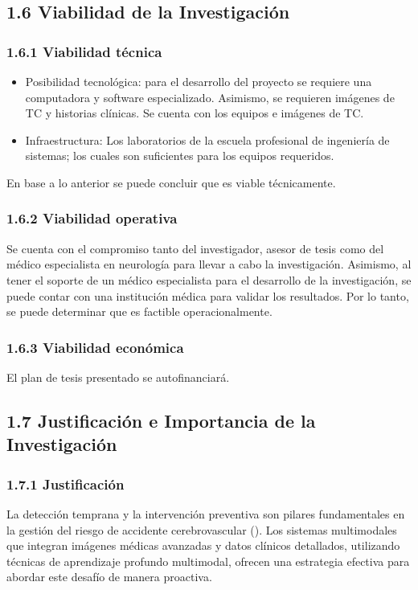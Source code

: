 \subsection{1.6 Viabilidad de la Investigación}
\subsubsection{1.6.1 Viabilidad técnica}

\begin{itemize}
    \item Posibilidad tecnológica: para el desarrollo del proyecto se requiere una computadora y software especializado. Asimismo, se requieren imágenes de TC y historias clínicas. Se cuenta con los equipos e imágenes de TC.
    \item Infraestructura: Los laboratorios de la escuela profesional de ingeniería de sistemas; los cuales son suficientes para los equipos requeridos. 
\end{itemize}
En base a lo anterior se puede concluir que es viable técnicamente.
\subsubsection{1.6.2 Viabilidad operativa}
Se cuenta con el compromiso tanto del investigador, asesor de tesis como del médico especialista en neurología para llevar a cabo la investigación. Asimismo, al tener el soporte de un médico especialista para el desarrollo de la investigación, se puede contar con una institución médica para validar los resultados. Por lo tanto, se puede determinar que es factible operacionalmente.
\subsubsection{1.6.3 Viabilidad económica}
El plan de tesis presentado se autofinanciará.
\subsection{1.7 Justificación e Importancia de la Investigación} 
\subsubsection{1.7.1 Justificación}
La detección temprana y la intervención preventiva son pilares fundamentales en la gestión del riesgo de accidente cerebrovascular (\cite{MALAGA2018}). Los sistemas multimodales que integran imágenes médicas avanzadas y datos clínicos detallados, utilizando técnicas de aprendizaje profundo multimodal, ofrecen una estrategia efectiva para abordar este desafío de manera proactiva.
\newline

